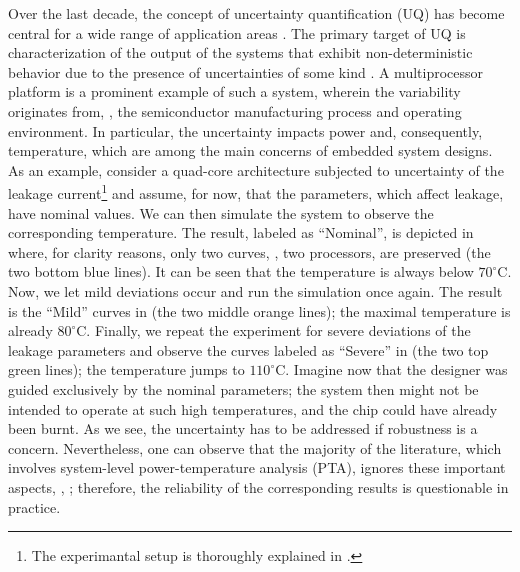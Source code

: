 Over the last decade, the concept of uncertainty quantification (UQ) has become central for a wide range of application areas \cite{xiu2010}. The primary target of UQ is characterization of the output of the systems that exhibit non-deterministic behavior due to the presence of uncertainties of some kind \cite{eldred2009}. A multiprocessor platform is a prominent example of such a system, wherein the variability originates from, \eg, the semiconductor manufacturing process and operating environment. In particular, the uncertainty impacts power and, consequently, temperature, which are among the main concerns of embedded system designs. As an example, consider a quad-core architecture subjected to uncertainty of the leakage current\footnote{The experimantal setup is thoroughly explained in .} and assume, for now, that the parameters, which affect leakage, have nominal values. We can then simulate the system to observe the corresponding temperature. The result, labeled as ``Nominal'', is depicted in  where, for clarity reasons, only two curves, \ie, two processors, are preserved (the two bottom blue lines). It can be seen that the temperature is always below $70^{\circ}$C. Now, we let mild deviations occur and run the simulation once again. The result is the ``Mild'' curves in  (the two middle orange lines); the maximal temperature is already $80^{\circ}$C. Finally, we repeat the experiment for severe deviations of the leakage parameters and observe the curves labeled as ``Severe'' in  (the two top green lines); the temperature jumps to $110^{\circ}$C. Imagine now that the designer was guided exclusively by the nominal parameters; the system then might not be intended to operate at such high temperatures, and the chip could have already been burnt. As we see, the uncertainty has to be addressed if robustness is a concern. Nevertheless, one can observe that the majority of the literature, which involves system-level power-temperature analysis (PTA), ignores these important aspects, \eg, \cite{rao2009, rai2011, thiele2011, ukhov2012}; therefore, the reliability of the corresponding results is questionable in practice.

